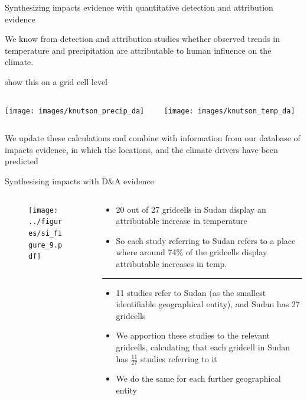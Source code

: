 \documentclass[9pt]{beamer}
\begin{document}
\begin{frame}{Synthesizing impacts evidence with quantitative detection and attribution evidence}

We know from detection and attribution studies whether observed trends in temperature and precipitation are attributable to human influence on the climate.

\cite{Knutson2013, Knutson2018} show this on a grid cell level

\begin{columns}
	\begin{column}{0.65\linewidth}
		\texttt{[image: images/knutson\_precip\_da]}
	\end{column}
	\begin{column}{0.35\linewidth}
		\texttt{[image: images/knutson\_temp\_da]}
	\end{column}
\end{columns}

We update these calculations and combine with information from our database of impacts evidence, in which the locations, and the climate drivers have been predicted

\end{frame}

\begin{frame}{Synthesising impacts with D\&A evidence}

\small

\begin{columns}
	\begin{column}{0.6\linewidth}
		\begin{figure}
			\texttt{[image: ../figures/si\_figure\_9.pdf]}
		\end{figure}
	\end{column}
	\begin{column}{0.4\linewidth}
		\begin{itemize}
			\item 20 out of 27 gridcells in Sudan display an attributable increase in temperature
			\item So each study referring to Sudan refers to a place where around 74\% of the gridcells display attributable increases in temp.
		\end{itemize}
				\rule{\linewidth}{0.2pt}
		\begin{itemize}
			\item 11 studies refer to Sudan (as the smallest identifiable geographical entity), and Sudan has 27 gridcells
			\item We apportion these studies to the relevant gridcells, calculating that each gridcell in Sudan has $\frac{11}{27}$ studies referring to it
			\item We do the same for each further geographical entity
		\end{itemize}
		
	\end{column}
\end{columns}

\end{frame}
\end{document}
